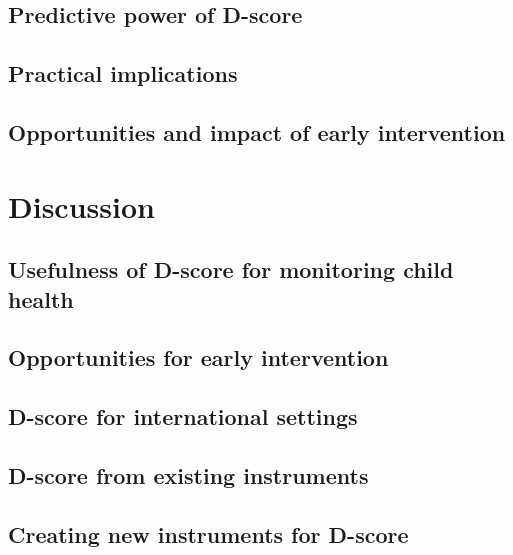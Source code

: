 \documentclass[]{book}
\begin{document}
\section{Predictive power of D-score}\label{predictive-power-of-d-score}

\section{Practical implications}\label{practical-implications-1}

\section{Opportunities and impact of early
intervention}\label{opportunities-and-impact-of-early-intervention}

\chapter{Discussion}\label{discussion}

\section{Usefulness of D-score for monitoring child
health}\label{usefulness-of-d-score-for-monitoring-child-health}

\section{Opportunities for early
intervention}\label{opportunities-for-early-intervention}

\section{D-score for international
settings}\label{d-score-for-international-settings}

\section{D-score from existing
instruments}\label{d-score-from-existing-instruments}

\section{Creating new instruments for
D-score}\label{creating-new-instruments-for-d-score}


\end{document}
